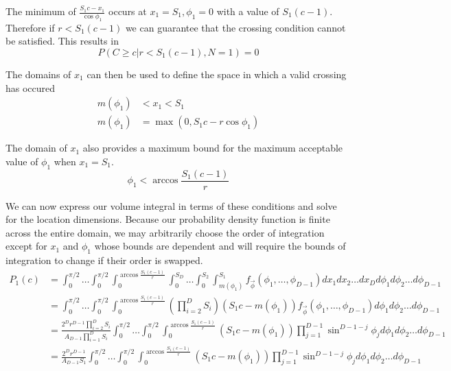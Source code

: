 \documentclass{article}
\begin{document}
The minimum of $\frac{S_1c - x_1}{\cos{\phi_1}}$ occurs at $x_1=S_1, \phi_1=0$ with a value of $S_1(c-1)$. Therefore if $r<S_1(c-1)$ we can guarantee that the crossing condition
cannot be satisfied. This results in
\begin{equation}
	P(C\ge c|r<S_1(c-1), N=1) = 0
\end{equation}

The domains of $x_1$ can then be used to define the space in which a valid crossing has occured 
\begin{align} 
	m(\phi_1) &< x_1 < S_1 \\ \label{eq:crossing condition 0}
	m(\phi_1) &= \max(0, S_1c-r\cos{\phi_1}) 
\end{align}

The domain of $x_1$ also provides a maximum bound for the maximum acceptable value of $\phi_1$ when $x_1 = S_1$.
\begin{equation}
	\phi_1 < \arccos{\frac{S_1(c-1)}{r}}
\end{equation}

We can now express our volume integral in terms of these conditions and solve for the location dimensions. Because our probability density function is finite across the entire domain, we may arbitrarily choose the order of integration except
for $x_1$ and $\phi_1$ whose bounds are dependent and will require the bounds of integration to change if their order is swapped.
\begin{align} \label{eq:volume integral}
	P_1(c) &= \int_0^{\pi/2} \hdots \int_0^{\pi/2} \int_0^{\arccos{\frac{S_1(c-1)}{r}}}\int_0^{S_D} \hdots \int_0^{S_2} \int_{m(\phi_1)}^{S_1} f_{\vec\phi}(\phi_1,\hdots,\phi_{D-1})dx_1 dx_2 \hdots dx_D d\phi_1 d\phi_2 \hdots d\phi_{D-1}\\
	&= \int_0^{\pi/2} \hdots \int_0^{\pi/2}\int_0^{\arccos{\frac{S_1(c-1)}{r}}}\left(\prod_{i=2}^DS_i\right)\left(S_1c-m(\phi_1)\right)  f_{\vec\phi}(\phi_1,\hdots,\phi_{D-1}) d\phi_1 d\phi_2 \hdots d\phi_{D-1} \\
	&= \frac{ 2^Dr^{D-1} \prod_{i=2}^DS_i}{A_{D-1}\prod_{i=1}^DS_i}\int_0^{\pi/2} \hdots \int_0^{\pi/2}\int_0^{\arccos{\frac{S_1(c-1)}{r}}} (S_1c-m(\phi_1)) \prod_{j=1}^{D-1}\sin^{D-1-j}\phi_j d\phi_1 d\phi_2\hdots d\phi_{D-1}\\
	&= \frac{ 2^Dr^{D-1}}{A_{D-1}S_1}\int_0^{\pi/2} \hdots \int_0^{\pi/2}\int_0^{\arccos{\frac{S_1(c-1)}{r}}} (S_1c-m(\phi_1)) \prod_{j=1}^{D-1}\sin^{D-1-j}\phi_j d\phi_1 d\phi_2 \hdots d\phi_{D-1}
\end{align}
\end{document}
